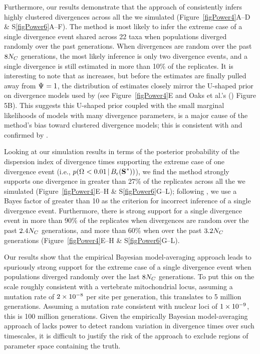 Furthermore, our results demonstrate that the approach of \citet{Hickerson2013}
consistently infers highly clustered divergences across all the  we
simulated (Figure~\ref{figPower4}A--D \& S\ref{figPower6}A--F).
The method is most likely to infer the extreme case of a single divergence
event shared across 22 taxa when populations diverged randomly over the past
\globalcoalunit generations.
When divergences are random over the past $8N_C$ generations, the
most likely inference is only two divergence events, and a single
divergence is still estimated in more than 10\% of the replicates.
It is interesting to note that as  increases, but before the
estimates are finally pulled away from $\Psi_{} = 1$, the distribution of
\numt{} estimates closely mirror the U-shaped prior on divergence models
used by \msb (see Figure~\ref{figPower4}E and Oaks et al.'s
(\citeyear{Oaks2012}) Figure 5B).
This suggests this U-shaped prior coupled with the small marginal likelihoods
of models with many divergence parameters, is a major cause of the method's
bias toward clustered divergence models; this is consistent with
\citet{Oaks2012} and confirmed by \citet{Oaks2014dpp}.

Looking at our simulation results in terms of the posterior probability of the
dispersion index of divergence times supporting the extreme case of one
divergence event (i.e., $p(\vmratio{} < 0.01 \given \ssSpace)$), we find the
method strongly supports one divergence in greater than 27\% of the replicates
across all the  we simulated (Figure~\ref{figPower4}E--H \&
S\ref{figPower6}G--L);
following \citet{Hickerson2013}, we use a Bayes factor of greater than 10 as
the criterion for incorrect inference of a single divergence event.
Furthermore, there is strong support for a single divergence event in
more than 90\% of the replicates when divergences are random over the past
$2.4N_C$ generations, and more than 60\% when over the past
$3.2N_C$ generations (Figure~\ref{figPower4}E--H \&
S\ref{figPower6}G--L).

Our results show that the empirical Bayesian model-averaging approach leads to
spuriously strong support for the extreme case of a single divergence event
when populations diverged randomly over the last $8N_C$ generations.
To put this on the scale roughly consistent with a vertebrate mitochondrial
locus, assuming a mutation rate of $2\times 10^{-8}$ per site per generation, this
translates to 5 million generations.
Assuming a mutation rate consistent with nuclear loci of $1\times 10^{-9}$, this is 100
million generations.
Given the empirically Bayesian model-averaging approach of \citet{Hickerson2013}
lacks power to detect random variation in divergence times over such
timescales, it is difficult to justify the risk of the approach to exclude
regions of parameter space containing the truth.

